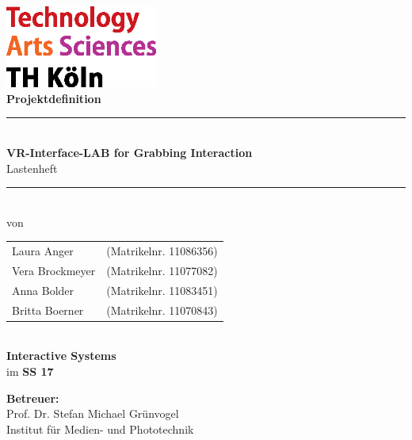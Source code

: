 \thispagestyle{empty}
\begin{center}
			\includegraphics[width=5cm]{Bilder/logo_TH}\\[12ex]
			{\Huge\textbf{Projektdefinition}}\\[8ex]
			\rule{.8\textwidth}{.2pt}
			{\Large\\[1ex] \textbf{VR-Interface-LAB for Grabbing Interaction}}\\
			{Lastenheft}\\
			\rule{.8\textwidth}{.2pt}\\[10ex]
			von\\[2ex]
			\begin{tabular}{ll}
			Laura Anger &(Matrikelnr. 11086356)\\ 
			Vera Brockmeyer &(Matrikelnr. 11077082)\\
			Anna Bolder &(Matrikelnr. 11083451)\\
			Britta Boerner &(Matrikelnr. 11070843)\\
			\end{tabular}\\[10ex]
			\textbf{Interactive Systems}\\
			im \textbf{SS 17}\\			
			\end{center}
			\vfill
			\begin{flushleft}
			{\bf Betreuer:}\\
			Prof. Dr. Stefan Michael Grünvogel\\
			Institut für Medien- und Phototechnik
			\end{flushleft}
	\newpage